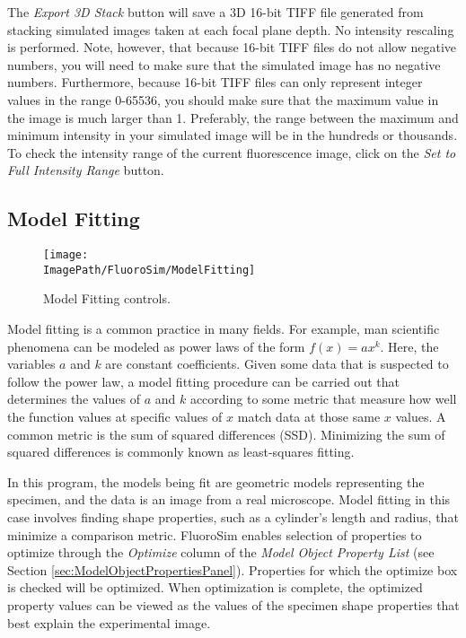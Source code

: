 \documentclass[11pt,titlepage,twoside]{article}
\begin{document}
The \emph{Export 3D Stack} button will save a 3D 16-bit TIFF file generated from stacking simulated images taken at each focal plane depth. No intensity rescaling is performed. Note, however, that because 16-bit TIFF files do not allow negative numbers, you will need to make sure that the simulated image has no negative numbers. Furthermore, because 16-bit TIFF files can only represent integer values in the range 0-65536, you should make sure that the maximum value in the image is much larger than 1. Preferably, the range between the maximum and minimum intensity in your simulated image will be in the hundreds or thousands. To check the intensity range of the current fluorescence image, click on the \emph{Set to Full Intensity Range} button.

\subsection{Model Fitting}
\label{sec:ModelFittingToFluorescenceImages}

\begin{figure}[tbp] %
   \centering
   \texttt{[image: \\ImagePath/FluoroSim/ModelFitting]} 
   \caption{Model Fitting controls.}
   \label{fig:FluoroSimModelFittingControls}
\end{figure}

Model fitting is a common practice in many fields. For example, man scientific phenomena can be modeled as power laws of the form $f(x) = ax^k$. Here, the variables $a$ and $k$ are constant coefficients. Given some data that is suspected to follow the power law, a model fitting procedure can be carried out that determines the values of $a$ and $k$ according to some metric that measure how well the function values at specific values of $x$ match data at those same $x$ values. A common metric is the sum of squared differences (SSD). Minimizing the sum of squared differences is commonly known as least-squares fitting.

In this program, the models being fit are geometric models representing the specimen, and the data is an image from a real microscope. Model fitting in this case involves finding shape properties, such as a cylinder's length and radius, that minimize a comparison metric. FluoroSim enables selection of properties to optimize through the \emph{Optimize} column of the \emph{Model Object Property List} (see Section \ref{sec:ModelObjectPropertiesPanel}). Properties for which the optimize box is checked will be optimized. When optimization is complete, the optimized property values can be viewed as the values of the specimen shape properties that best explain the experimental image.
\end{document}
